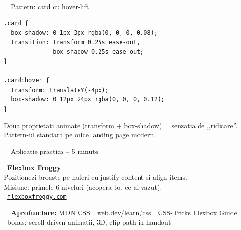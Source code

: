 \documentclass[aspectratio=169,11pt]{beamer}
\newcommand{\setaccent}[1]{\colorlet{accent}{#1}}
\newcommand{\code}[1]{{\ttfamily\small\color{accent!85!black}#1}}
\begin{document}
\begin{frame}[fragile]{\textcolor{themeCss}{\faPaintBrush}\ \ Pattern: card cu hover-lift}
\vspace{6pt}
\begin{lstlisting}[style=css]
.card {
  box-shadow: 0 1px 3px rgba(0, 0, 0, 0.08);
  transition: transform 0.25s ease-out,
              box-shadow 0.25s ease-out;
}

.card:hover {
  transform: translateY(-4px);
  box-shadow: 0 12px 24px rgba(0, 0, 0, 0.12);
}
\end{lstlisting}
\vspace{4pt}
\begin{takeaway}
Doua proprietati animate (\code{transform} + \code{box-shadow}) = senzatia de ,,ridicare''. Pattern-ul standard pe orice landing page modern.
\end{takeaway}
\end{frame}

\begin{frame}{\textcolor{themeCss}{\faGamepad}\ \ Aplicatie practica -- 5 minute}
  \vspace{20pt}
  \begin{joculet}
    {\large\color{themeCss}\faGamepad\ \textbf{Flexbox Froggy}}\\[6pt]
    Pozitionezi broaste pe nuferi cu \code{justify-content} si \code{align-items}.\\
    Misiune: primele 6 niveluri (acopera tot ce ai vazut).\\[8pt]
    {\color{themeCss}\faLink\ \href{https://flexboxfroggy.com}{\texttt{flexboxfroggy.com}}}
  \end{joculet}

  \vspace{16pt}
  {\footnotesize\color{textDim}\faGraduationCap\ \ \textbf{Aprofundare:} \href{https://developer.mozilla.org/en-US/docs/Web/CSS}{MDN CSS} \,\textbullet\, \href{https://web.dev/learn/css}{web.dev/learn/css} \,\textbullet\, \href{https://css-tricks.com/snippets/css/a-guide-to-flexbox/}{CSS-Tricks Flexbox Guide} \,\textbullet\, \textcolor{themeBonus}{\faRocket\ bonus: scroll-driven animatii, 3D, clip-path in handout}}
\end{frame}

\setaccent{themeJs}
\end{document}

